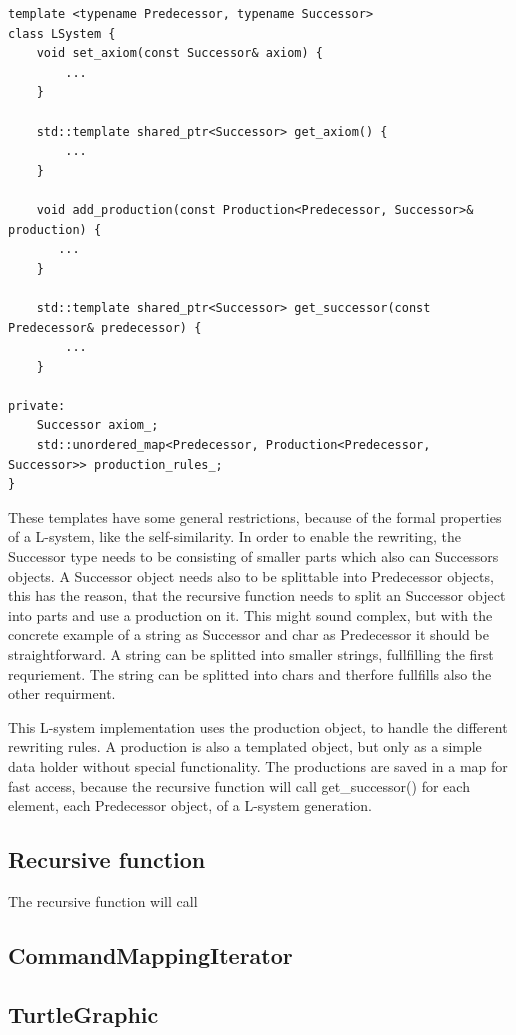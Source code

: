 \documentclass[english]{cpp-hmwk}
\begin{document}
\begin{lstlisting}
template <typename Predecessor, typename Successor>
class LSystem {
    void set_axiom(const Successor& axiom) {
        ...
    }

    std::template shared_ptr<Successor> get_axiom() {
        ...
    }

    void add_production(const Production<Predecessor, Successor>& production) {
       ...
    }

    std::template shared_ptr<Successor> get_successor(const Predecessor& predecessor) {
        ...
    }
    
private:
    Successor axiom_;
    std::unordered_map<Predecessor, Production<Predecessor, Successor>> production_rules_;
}
\end{lstlisting}

\noindent These templates have some general restrictions, because of the formal properties of a L-system, like the self-similarity. In order to enable the rewriting, the Successor type needs to be consisting of smaller parts which also can Successors objects. A Successor object needs also to be splittable into Predecessor objects, this has the reason, that the recursive function needs to split an Successor object into parts and use a production on it.
This might sound complex, but with the concrete example of a string as Successor and char as Predecessor it should be straightforward. A string can be splitted into smaller strings, fullfilling the first requriement. The string can be splitted into chars and therfore fullfills also the other requirment.

This L-system implementation uses the production object, to handle the different rewriting rules. A production is also a templated object, but only as a simple data holder without special functionality. The productions are saved in a map for fast access, because the recursive function will call get\_successor() for each element, each Predecessor object, of a L-system generation.

\subsection{Recursive function}
The recursive function will call 


\subsection{CommandMappingIterator}

\subsection{TurtleGraphic}
\end{document}
